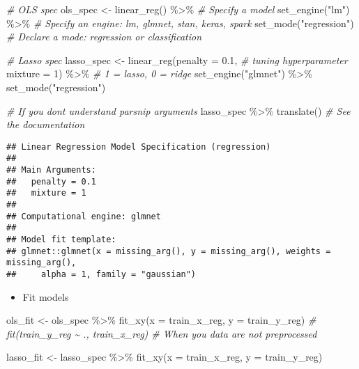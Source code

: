 \documentclass[
]{book}
\newenvironment{Shaded}{\begin{snugshade}}{\end{snugshade}}
\newcommand{\AttributeTok}[1]{\textcolor[rgb]{0.77,0.63,0.00}{#1}}
\newcommand{\CommentTok}[1]{\textcolor[rgb]{0.56,0.35,0.01}{\textit{#1}}}
\newcommand{\DecValTok}[1]{\textcolor[rgb]{0.00,0.00,0.81}{#1}}
\newcommand{\FloatTok}[1]{\textcolor[rgb]{0.00,0.00,0.81}{#1}}
\newcommand{\FunctionTok}[1]{\textcolor[rgb]{0.00,0.00,0.00}{#1}}
\newcommand{\NormalTok}[1]{#1}
\newcommand{\OtherTok}[1]{\textcolor[rgb]{0.56,0.35,0.01}{#1}}
\newcommand{\SpecialCharTok}[1]{\textcolor[rgb]{0.00,0.00,0.00}{#1}}
\newcommand{\StringTok}[1]{\textcolor[rgb]{0.31,0.60,0.02}{#1}}
\providecommand{\tightlist}{%
  \setlength{\itemsep}{0pt}\setlength{\parskip}{0pt}}
\begin{document}
\begin{Shaded}
\begin{Highlighting}[]
\CommentTok{\# OLS spec }
\NormalTok{ols\_spec }\OtherTok{\textless{}{-}} \FunctionTok{linear\_reg}\NormalTok{() }\SpecialCharTok{\%\textgreater{}\%} \CommentTok{\# Specify a model }
  \FunctionTok{set\_engine}\NormalTok{(}\StringTok{"lm"}\NormalTok{) }\SpecialCharTok{\%\textgreater{}\%} \CommentTok{\# Specify an engine: lm, glmnet, stan, keras, spark }
  \FunctionTok{set\_mode}\NormalTok{(}\StringTok{"regression"}\NormalTok{) }\CommentTok{\# Declare a mode: regression or classification }

\CommentTok{\# Lasso spec }
\NormalTok{lasso\_spec }\OtherTok{\textless{}{-}} \FunctionTok{linear\_reg}\NormalTok{(}\AttributeTok{penalty =} \FloatTok{0.1}\NormalTok{, }\CommentTok{\# tuning hyperparameter }
                         \AttributeTok{mixture =} \DecValTok{1}\NormalTok{) }\SpecialCharTok{\%\textgreater{}\%} \CommentTok{\# 1 = lasso, 0 = ridge }
  \FunctionTok{set\_engine}\NormalTok{(}\StringTok{"glmnet"}\NormalTok{) }\SpecialCharTok{\%\textgreater{}\%}
  \FunctionTok{set\_mode}\NormalTok{(}\StringTok{"regression"}\NormalTok{) }

\CommentTok{\# If you don\textquotesingle{}t understand parsnip arguments }
\NormalTok{lasso\_spec }\SpecialCharTok{\%\textgreater{}\%} \FunctionTok{translate}\NormalTok{() }\CommentTok{\# See the documentation}
\end{Highlighting}
\end{Shaded}

\begin{verbatim}
## Linear Regression Model Specification (regression)
## 
## Main Arguments:
##   penalty = 0.1
##   mixture = 1
## 
## Computational engine: glmnet 
## 
## Model fit template:
## glmnet::glmnet(x = missing_arg(), y = missing_arg(), weights = missing_arg(), 
##     alpha = 1, family = "gaussian")
\end{verbatim}

\begin{itemize}
\tightlist
\item
  Fit models
\end{itemize}

\begin{Shaded}
\begin{Highlighting}[]
\NormalTok{ols\_fit }\OtherTok{\textless{}{-}}\NormalTok{ ols\_spec }\SpecialCharTok{\%\textgreater{}\%}
  \FunctionTok{fit\_xy}\NormalTok{(}\AttributeTok{x =}\NormalTok{ train\_x\_reg, }\AttributeTok{y =}\NormalTok{ train\_y\_reg) }
  \CommentTok{\# fit(train\_y\_reg \textasciitilde{} ., train\_x\_reg) \# When you data are not preprocessed }

\NormalTok{lasso\_fit }\OtherTok{\textless{}{-}}\NormalTok{ lasso\_spec }\SpecialCharTok{\%\textgreater{}\%}
  \FunctionTok{fit\_xy}\NormalTok{(}\AttributeTok{x =}\NormalTok{ train\_x\_reg, }\AttributeTok{y =}\NormalTok{ train\_y\_reg) }
\end{Highlighting}
\end{Shaded}
\end{document}
